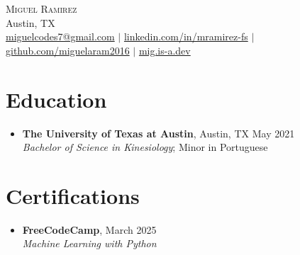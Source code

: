 \documentclass[letterpaper,10pt]{article}
\begin{document}
\begin{center}
  {\Huge \scshape Miguel Ramirez} \\ \vspace{1pt}
  Austin, TX \\ 
  \href{mailto:miguelcodes7@gmail.com}{miguelcodes7@gmail.com} $|$
  \href{https://linkedin.com/in/mramirez-fs}{linkedin.com/in/mramirez-fs} $|$
  \href{https://github.com/miguelaram2016}{github.com/miguelaram2016} $|$
  \href{https://mig.is-a.dev}{mig.is-a.dev}
\end{center}

\section*{Education}
\begin{itemize}[leftmargin=0.15in]
  \item[]
    \textbf{The University of Texas at Austin}, Austin, TX \hfill May 2021 \\
    \textit{Bachelor of Science in Kinesiology}; Minor in Portuguese
\end{itemize}

\section*{Certifications}
\begin{itemize}[leftmargin=0.15in]
  \item[]
    \textbf{FreeCodeCamp}, \hfill March 2025 \\
    \textit{Machine Learning with Python} \
\end{itemize}

\end{document}
